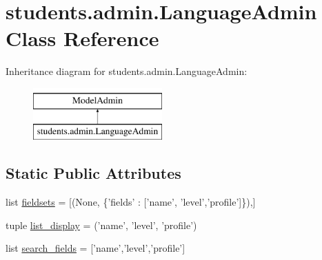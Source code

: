 \hypertarget{classstudents_1_1admin_1_1_language_admin}{\section{students.\-admin.\-Language\-Admin Class Reference}
\label{classstudents_1_1admin_1_1_language_admin}
}
Inheritance diagram for students.\-admin.\-Language\-Admin\-:\begin{figure}[H]
\begin{center}
\leavevmode
\includegraphics[height=2.000000cm]{classstudents_1_1admin_1_1_language_admin}
\end{center}
\end{figure}
\subsection*{Static Public Attributes}
\begin{DoxyCompactItemize}
\item 
list \hyperlink{classstudents_1_1admin_1_1_language_admin_adb64e35cb2808fcb92ba85970394ed60}{fieldsets} = \mbox{[}(None, \{'fields' \-: \mbox{[}'name', 'level','profile'\mbox{]}\}),\mbox{]}
\item 
tuple \hyperlink{classstudents_1_1admin_1_1_language_admin_a36a061d2b5f97c82377a82b5a611fe38}{list\-\_\-display} = ('name', 'level', 'profile')
\item 
list \hyperlink{classstudents_1_1admin_1_1_language_admin_a810be0e4fc8b533d9e02cc3bbe7bc1dc}{search\-\_\-fields} = \mbox{[}'name','level','profile'\mbox{]}
\end{DoxyCompactItemize}


